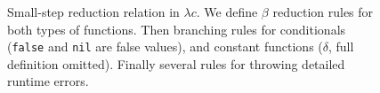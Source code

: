 \begin{figure}
\caption{Small-step reduction relation in $\lambda c$.
  We define $\beta$ reduction rules for both types of functions.
  Then branching rules for conditionals (\texttt{false} and \texttt{nil} are false values),
  and constant functions ($\delta$, full definition omitted).
  Finally several rules for throwing detailed runtime errors.
  }
  \label{arrowv}
\end{figure}

